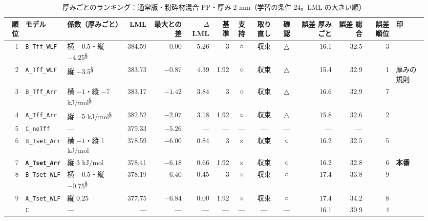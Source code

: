 \documentclass[paper=a4paper,landscape,fontsize=10pt,line_length=62zw,number_of_lines=34]{jlreq}
\let\origtextbf\textbf
\renewcommand{\textbf}[1]{\origtextbf{\gtfamily #1}}   %
\begin{document}
\begin{table}[H]\centering\footnotesize
\caption{厚みごとのランキング：通常版・粉砕材混合 PP・厚み 2 mm（学習の条件 24。LML の大きい順）}
\begin{tabular}{rlp{11\zw}rrrrccc rrrl}
\toprule
順位 & モデル & 係数（厚みごと） & LML & 最大との差 & $\Delta$LML & 基準 & 支持 & 取り直し & 確認 & 誤差 厚みごと & 誤差 総合 & 誤差順位 & 印 \\
\midrule
1 & \texttt{B\_\allowbreak{}Tff\_\allowbreak{}WLF} & 横 $-0.5$・縦 $-4.25$\textsuperscript{§} & 384.59 & 0.00 & 5.26 & 3 & ○ & 収束 & △ & 16.1 & 32.5 & 3 &  \\
2 & \texttt{A\_\allowbreak{}Tff\_\allowbreak{}WLF} & 縦 $-3.5$\textsuperscript{§} & 383.73 & $-0.87$ & 4.39 & 1.92 & ○ & 収束 & △ & 15.4 & 32.9 & 1 & 厚みの規則 \\
3 & \texttt{B\_\allowbreak{}Tff\_\allowbreak{}Arr} & 横 $-1$・縦 $-7$ kJ/mol\textsuperscript{§} & 383.17 & $-1.42$ & 3.84 & 3 & ○ & 収束 & △ & 16.6 & 32.9 & 7 &  \\
4 & \texttt{A\_\allowbreak{}Tff\_\allowbreak{}Arr} & 縦 $-5$ kJ/mol\textsuperscript{§} & 382.52 & $-2.07$ & 3.18 & 1.92 & ○ & 収束 & △ & 15.8 & 32.6 & 2 &  \\
5 & \texttt{C\_\allowbreak{}noTff} & --- & 379.33 & $-5.26$ & --- & --- & --- & --- & --- & --- & --- &  &  \\
6 & \texttt{B\_\allowbreak{}Tset\_\allowbreak{}Arr} & 横 $-1$・縦 1 kJ/mol & 378.59 & $-6.00$ & 0.84 & 3 & × & 収束 & ○ & 16.2 & 32.5 & 5 &  \\
7 & \textbf{\texttt{A\_\allowbreak{}Tset\_\allowbreak{}Arr}} & 縦 3 kJ/mol & 378.41 & $-6.18$ & 0.66 & 1.92 & × & 収束 & ○ & 16.2 & 32.8 & 6 & \textbf{本番} \\
8 & \texttt{B\_\allowbreak{}Tset\_\allowbreak{}WLF} & 横 $-0.5$・縦 $-0.75$\textsuperscript{§} & 378.19 & $-6.40$ & 0.45 & 3 & × & 収束 & ○ & 17.4 & 33.8 & 9 &  \\
9 & \texttt{A\_\allowbreak{}Tset\_\allowbreak{}WLF} & 縦 0.25 & 377.75 & $-6.84$ & 0.00 & 1.92 & × & 収束 & ○ & 17.4 & 34.2 & 8 &  \\
 & \texttt{C} & --- & --- & --- & --- & --- & --- & --- & --- & 16.1 & 30.9 & 4 &  \\
\bottomrule
\end{tabular}
\end{table}
\end{document}
